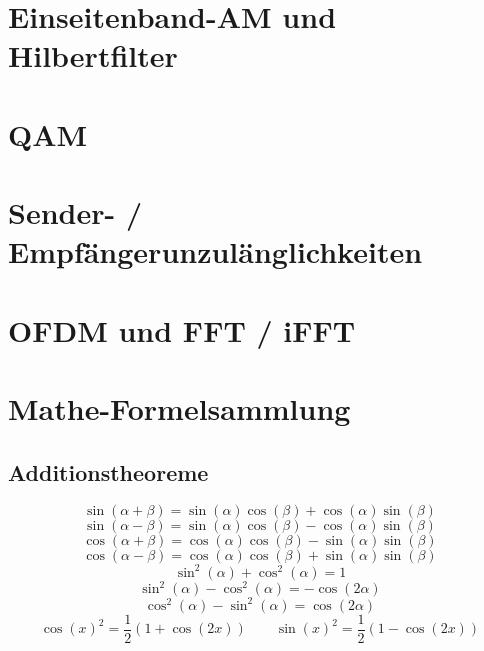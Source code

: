 \documentclass[a4paper, 11pt]{article}
\begin{document}
\section*{Einseitenband-AM und Hilbertfilter}
\section*{QAM}
\section*{Sender- / Empfängerunzulänglichkeiten}
\section*{OFDM und FFT / iFFT}
\section*{Mathe-Formelsammlung}
\subsection*{Additionstheoreme}
\[\sin(\alpha + \beta)=\sin(\alpha)\cos(\beta)+\cos(\alpha)\sin(\beta)\]
\[\sin(\alpha - \beta)=\sin(\alpha)\cos(\beta)-\cos(\alpha)\sin(\beta)\]
\[\cos(\alpha + \beta)=\cos(\alpha)\cos(\beta)-\sin(\alpha)\sin(\beta)\]
\[\cos(\alpha - \beta)=\cos(\alpha)\cos(\beta)+\sin(\alpha)\sin(\beta)\]
\[\sin^2(\alpha)+\cos^2(\alpha)=1\]
\[\sin^2(\alpha)-\cos^2(\alpha)=-\cos(2\alpha)\]
\[\cos^2(\alpha)-\sin^2(\alpha)=\cos(2\alpha)\]
\[\cos(x)^2 = \frac{1}{2} \left(1 + \cos(2x) \right) \qquad \sin(x)^2 = \frac{1}{2} \left(1 - \cos(2x) \right)\]

\end{document}
